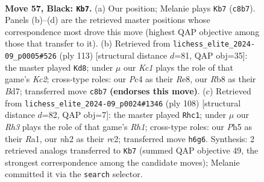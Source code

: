 \documentclass[11pt]{article}
\begin{document}
\begin{figure}[p]\centering
\begin{subfigure}{0.46\textwidth}\centering
\resizebox{\linewidth}{!}{%
\newchessgame
\chessboard[
  setfen={1rk2b2/6p1/p1p4r/Pp1b1p1p/2p2P1P/2B1P1P1/1P2K2N/1R4R1 b - - 16 57},
  showmover=false,
  pgfstyle=straightmove, color=movearrow, markmove={c8-b7}
]}
\caption{}
\end{subfigure}\hfill
\begin{subfigure}{0.46\textwidth}\centering
\resizebox{\linewidth}{!}{%
\newchessgame
\chessboard[
  setfen={4r2r/2kb1p2/4p1p1/1p1pP2p/pP3P2/P1P1R1P1/3RB2P/3K4 b - - 54 57},
  showmover=false,
  pgfstyle=straightmove, color=movearrow, markmove={c7-d8}
]}
\caption{}
\end{subfigure}
\\[4pt]
\begin{subfigure}{0.46\textwidth}\centering
\resizebox{\linewidth}{!}{%
\newchessgame
\chessboard[
  setfen={2k5/2p2p2/2pr2p1/p5Pp/P2BPK1P/1bP2P2/2r5/R6R w - - 59 55},
  showmover=false,
  pgfstyle=straightmove, color=movearrow, markmove={h1-c1}
]}
\caption{}
\end{subfigure}\hfill

\caption{\textbf{Move 57, Black: \texttt{Kb7}.} (a) Our position; Melanie plays \texttt{Kb7} (\texttt{c8b7}). Panels (b)--(d) are the retrieved master positions whose correspondence most drove this move (highest QAP objective among those that transfer to it). (b) Retrieved from \texttt{lichess\_elite\_2024-09\_p0005\#526} (ply 113) [structural distance $d$=81, QAP obj=35]: the master played \texttt{Kd8}; under $\mu$ our \emph{Kc1} plays the role of that game's \emph{Kc2}; cross-type roles: our \emph{P}c4 as their \emph{R}e8, our \emph{R}b8 as their \emph{B}d7; transferred move \texttt{c8b7} \textbf{(endorses this move)}. (c) Retrieved from \texttt{lichess\_elite\_2024-09\_p0024\#1346} (ply 108) [structural distance $d$=82, QAP obj=7]: the master played \texttt{Rhc1}; under $\mu$ our \emph{Rh3} plays the role of that game's \emph{Rh1}; cross-type roles: our \emph{P}h5 as their \emph{R}a1, our \emph{n}h2 as their \emph{r}c2; transferred move \texttt{h6g6}. Synthesis: 2 retrieved analogs transferred to \texttt{Kb7} (summed QAP objective 49, the strongest correspondence among the candidate moves); Melanie committed it via the \texttt{search} selector.}
\label{fig:thought-m113}
\end{figure}

\clearpage
\end{document}

